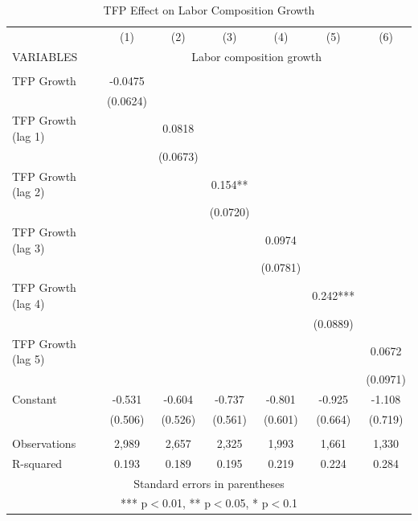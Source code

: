 \documentclass[12pt]{article}
\begin{document}
\begin{table}
\center
\scriptsize
\caption{TFP Effect on Labor Composition Growth}
\label{estimation2}
\begin{tabular}{lcccccc} \hline \hline
 & (1) & (2) & (3) & (4) & (5) & (6)\\
VARIABLES & \multicolumn{6}{c}{Labor composition growth} \\ \hline
 &  &  &  &  &  &  \\
TFP Growth & -0.0475 &  &  &  &  &  \\
 & (0.0624) &  &  &  &  &  \\
TFP Growth (lag 1) &  & 0.0818 &  &  &  &  \\
 &  & (0.0673) &  &  &  &  \\
TFP Growth (lag 2) &  &  & 0.154** &  &  &  \\
 &  &  & (0.0720) &  &  &  \\
TFP Growth (lag 3) &  &  &  & 0.0974 &  &  \\
 &  &  &  & (0.0781) &  &  \\
TFP Growth (lag 4) &  &  &  &  & \color{red} 0.242*** &  \\
 &  &  &  &  & \color{red} (0.0889) &  \\
TFP Growth (lag 5) &  &  &  &  &  & 0.0672 \\
 &  &  &  &  &  & (0.0971) \\
Constant & -0.531 & -0.604 & -0.737 & -0.801 & -0.925 & -1.108 \\
 & (0.506) & (0.526) & (0.561) & (0.601) & (0.664) & (0.719) \\
 &  &  &  &  &  &  \\
Observations & 2,989 & 2,657 & 2,325 & 1,993 & 1,661 & 1,330 \\
 R-squared & 0.193 & 0.189 & 0.195 & 0.219 & 0.224 & 0.284 \\ \hline
\multicolumn{7}{c}{ Standard errors in parentheses} \\
\multicolumn{7}{c}{ *** p$<$0.01, ** p$<$0.05, * p$<$0.1} \\
\end{tabular}
\end{table}
\end{document}
